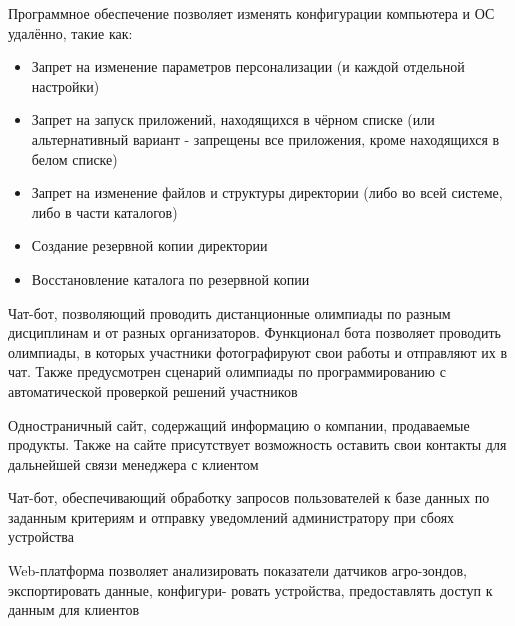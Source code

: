 \documentclass[10pt,a4paper,ragged2e,withhyper]{altacv}
\begin{document}
Программное обеспечение позволяет изменять конфигурации компьютера и ОС удалённо, такие как: 
\begin{itemize}
\item Запрет на изменение параметров персонализации (и каждой отдельной настройки)
\item Запрет на запуск приложений, находящихся в чёрном списке (или альтернативный вариант - запрещены все приложения, кроме находящихся в белом списке)
\item Запрет на изменение файлов и структуры директории (либо во всей системе, либо в части каталогов)
\item Создание резервной копии директории
\item Восстановление каталога по резервной копии
\end{itemize}

\divider

Чат-бот, позволяющий проводить дистанционные олимпиады по разным дисциплинам и от разных организаторов. Функционал бота позволяет проводить олимпиады, в которых участники фотографируют свои работы и отправляют их в чат. Также предусмотрен сценарий олимпиады по программированию с автоматической проверкой решений участников

\divider

Одностраничный сайт, содержащий информацию о компании, продаваемые продукты. Также на сайте присутствует возможность оставить свои контакты для дальнейшей связи менеджера с клиентом

\divider

Чат-бот, обеспечивающий обработку запросов пользователей к базе данных по заданным критериям и отправку
уведомлений администратору при сбоях устройства

\divider

Web-платформа позволяет анализировать показатели датчиков агро-зондов, экспортировать данные, конфигури-
ровать устройства, предоставлять доступ к данным для клиентов
\end{document}
